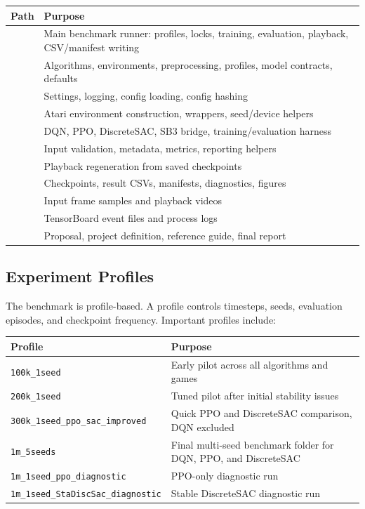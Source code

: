 \documentclass[11pt]{article}
\begin{document}
\begin{longtable}{L{0.23\textwidth} L{0.67\textwidth}}
\toprule
Path & Purpose \\
\midrule
\endhead
{} & Main benchmark runner: profiles, locks, training, evaluation, playback, CSV/manifest writing \\
 & Algorithms, environments, preprocessing, profiles, model contracts, defaults \\
 & Settings, logging, config loading, config hashing \\
 & Atari environment construction, wrappers, seed/device helpers \\
 & DQN, PPO, DiscreteSAC, SB3 bridge, training/evaluation harness \\
 & Input validation, metadata, metrics, reporting helpers \\
 & Playback regeneration from saved checkpoints \\
 & Checkpoints, result CSVs, manifests, diagnostics, figures \\
 & Input frame samples and playback videos \\
 & TensorBoard event files and process logs \\
 & Proposal, project definition, reference guide, final report \\
\bottomrule
\end{longtable}

\subsection*{Experiment Profiles}

The benchmark is profile-based. A profile controls timesteps, seeds, evaluation episodes, and checkpoint frequency. Important profiles include:

\begin{longtable}{L{0.35\textwidth} L{0.55\textwidth}}
\toprule
Profile & Purpose \\
\midrule
\endhead
\texttt{100k\_1seed} & Early pilot across all algorithms and games \\
\texttt{200k\_1seed} & Tuned pilot after initial stability issues \\
\texttt{300k\_1seed\_ppo\_sac\_improved} & Quick PPO and DiscreteSAC comparison, DQN excluded \\
\texttt{1m\_5seeds} & Final multi-seed benchmark folder for DQN, PPO, and DiscreteSAC \\
\texttt{1m\_1seed\_ppo\_diagnostic} & PPO-only diagnostic run \\
\texttt{1m\_1seed\_StaDiscSac\_diagnostic} & Stable DiscreteSAC diagnostic run \\
\bottomrule
\end{longtable}
\end{document}
